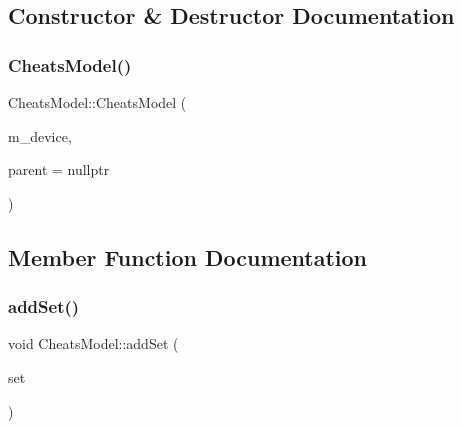 \subsection{Constructor \& Destructor Documentation}
\mbox{\label{class_q_g_b_a_1_1_cheats_model_ad36f22766ac53d178fde4ec024a56b49}} 
\subsubsection{\texorpdfstring{Cheats\+Model()}{CheatsModel()}}
{\footnotesize\ttfamily Cheats\+Model\+::\+Cheats\+Model (\begin{DoxyParamCaption}\item[{m\+Cheat\+Device $\ast$}]{m\+\_\+device,  }\item[{Q\+Object $\ast$}]{parent = {\ttfamily nullptr} }\end{DoxyParamCaption})}



\subsection{Member Function Documentation}
\mbox{\label{class_q_g_b_a_1_1_cheats_model_aab186665fb45851e46b12ef51df879e2}} 
\subsubsection{\texorpdfstring{add\+Set()}{addSet()}}
{\footnotesize\ttfamily void Cheats\+Model\+::add\+Set (\begin{DoxyParamCaption}\item[{m\+Cheat\+Set $\ast$}]{set }\end{DoxyParamCaption})}

